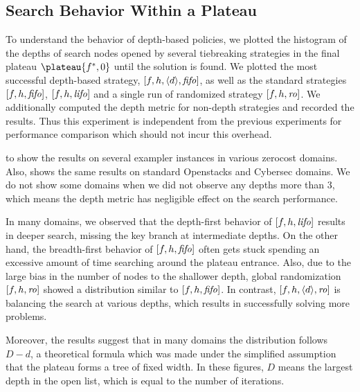 


\subsection{Search Behavior Within a Plateau}

To understand the behavior of depth-based policies, we plotted the
histogram of the depths of search nodes opened by several tiebreaking
strategies in the final plateau $\plateau{f^*,0}$ until the solution is
found.  We plotted the most successful depth-based strategy,
$[f,h,{\left<d\right>},{\text{\textit{fifo}}}]$, as well as the standard strategies $[f,h,{\text{\textit{fifo}}}]$,
$[f,h,{\text{\textit{lifo}}}]$ and a single run of randomized strategy $[f,h,{\text{\textit{ro}}}]$.
We additionally computed the depth metric for non-depth strategies and
recorded the results. Thus this experiment is independent from the
previous experiments for performance comparison which should not incur
this overhead.


 to 
 show the results on several exampler
instances in various zerocost domains. Also,
  shows the same results on standard
 Openstacks and Cybersec domains. We do not show some domains when we did
not observe any depths more than 3, which means the depth metric has
negligible effect on the search performance.

In many domains, we observed that the depth-first behavior of
$[f,h,{\text{\textit{lifo}}}]$ results in deeper search, missing the key branch at
intermediate depths.  On the other hand, the breadth-first behavior of
$[f,h,{\text{\textit{fifo}}}]$ often gets stuck spending an excessive amount of time
searching around the plateau entrance.  Also, due to the large bias in
the number of nodes to the shallower depth, global randomization
$[f,h,{\text{\textit{ro}}}]$ showed a distribution similar to $[f,h,{\text{\textit{fifo}}}]$.
In contrast, $[f,h,{\left<d\right>},{\text{\textit{ro}}}]$ is balancing the search at various depths, which
results in successfully solving more problems.

Moreover, the results suggest that in many domains the distribution follows
$D-d$, a theoretical formula which was made under the simplified
assumption that the plateau forms a tree of fixed width. In these
figures, $D$ means the largest depth in the open list, which is equal to
the number of iterations.

